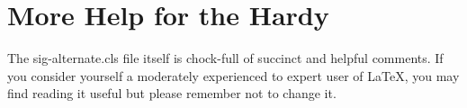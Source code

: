 \documentclass{sig-alternate-05-2015}
\begin{document}
\section{More Help for the Hardy}
The sig-alternate.cls file itself is chock-full of succinct
and helpful comments.  If you consider yourself a moderately
experienced to expert user of \LaTeX, you may find reading
it useful but please remember not to change it.
\end{document}
